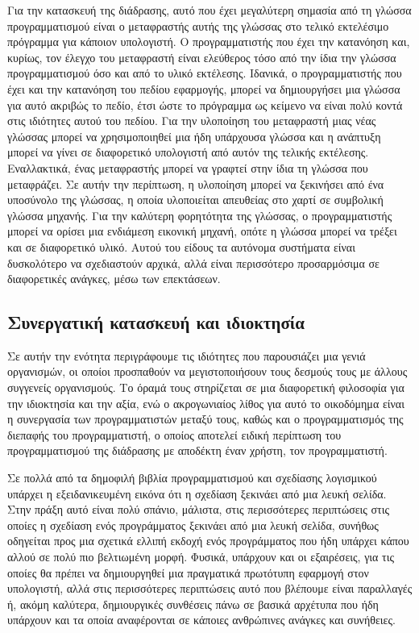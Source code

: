 \documentclass[
]{article}
\begin{document}
Για την κατασκευή της διάδρασης, αυτό που έχει μεγαλύτερη σημασία από τη
γλώσσα προγραμματισμού είναι ο μεταφραστής αυτής της γλώσσας στο τελικό
εκτελέσιμο πρόγραμμα για κάποιον υπολογιστή. Ο προγραμματιστής που έχει
την κατανόηση και, κυρίως, τον έλεγχο του μεταφραστή είναι ελεύθερος
τόσο από την ίδια την γλώσσα προγραμματισμού όσο και από το υλικό
εκτέλεσης. Ιδανικά, ο προγραμματιστής που έχει και την κατανόηση του
πεδίου εφαρμογής, μπορεί να δημιουργήσει μια γλώσσα για αυτό ακριβώς το
πεδίο, έτσι ώστε το πρόγραμμα ως κείμενο να είναι πολύ κοντά στις
ιδιότητες αυτού του πεδίου. Για την υλοποίηση του μεταφραστή μιας νέας
γλώσσας μπορεί να χρησιμοποιηθεί μια ήδη υπάρχουσα γλώσσα και η ανάπτυξη
μπορεί να γίνει σε διαφορετικό υπολογιστή από αυτόν της τελικής
εκτέλεσης. Εναλλακτικά, ένας μεταφραστής μπορεί να γραφτεί στην ίδια τη
γλώσσα που μεταφράζει. Σε αυτήν την περίπτωση, η υλοποίηση μπορεί να
ξεκινήσει από ένα υποσύνολο της γλώσσας, η οποία υλοποιείται απευθείας
στο χαρτί σε συμβολική γλώσσα μηχανής. Για την καλύτερη φορητότητα της
γλώσσας, ο προγραμματιστής μπορεί να ορίσει μια ενδιάμεση εικονική
μηχανή, οπότε η γλώσσα μπορεί να τρέξει και σε διαφορετικό υλικό. Αυτού
του είδους τα αυτόνομα συστήματα είναι δυσκολότερο να σχεδιαστούν
αρχικά, αλλά είναι περισσότερο προσαρμόσιμα σε διαφορετικές ανάγκες,
μέσω των επεκτάσεων.

\hypertarget{ux3c3ux3c5ux3bdux3b5ux3c1ux3b3ux3b1ux3c4ux3b9ux3baux3ae-ux3baux3b1ux3c4ux3b1ux3c3ux3baux3b5ux3c5ux3ae-ux3baux3b1ux3b9-ux3b9ux3b4ux3b9ux3bfux3baux3c4ux3b7ux3c3ux3afux3b1}{%
\subsection{Συνεργατική κατασκευή και
ιδιοκτησία}\label{ux3c3ux3c5ux3bdux3b5ux3c1ux3b3ux3b1ux3c4ux3b9ux3baux3ae-ux3baux3b1ux3c4ux3b1ux3c3ux3baux3b5ux3c5ux3ae-ux3baux3b1ux3b9-ux3b9ux3b4ux3b9ux3bfux3baux3c4ux3b7ux3c3ux3afux3b1}}

Σε αυτήν την ενότητα περιγράφουμε τις ιδιότητες που παρουσιάζει μια
γενιά οργανισμών, οι οποίοι προσπαθούν να μεγιστοποιήσουν τους δεσμούς
τους με άλλους συγγενείς οργανισμούς. Το όραμά τους στηρίζεται σε μια
διαφορετική φιλοσοφία για την ιδιοκτησία και την αξία, ενώ ο
ακρογωνιαίος λίθος για αυτό το οικοδόμημα είναι η συνεργασία των
προγραμματιστών μεταξύ τους, καθώς και ο προγραμματισμός της διεπαφής
του προγραμματιστή, ο οποίος αποτελεί ειδική περίπτωση του
προγραμματισμού της διάδρασης με αποδέκτη έναν χρήστη, τον
προγραμματιστή.

Σε πολλά από τα δημοφιλή βιβλία προγραμματισμού και σχεδίασης λογισμικού
υπάρχει η εξειδανικευμένη εικόνα ότι η σχεδίαση ξεκινάει από μια λευκή
σελίδα. Στην πράξη αυτό είναι πολύ σπάνιο, μάλιστα, στις περισσότερες
περιπτώσεις στις οποίες η σχεδίαση ενός προγράμματος ξεκινάει από μια
λευκή σελίδα, συνήθως οδηγείται προς μια σχετικά ελλιπή εκδοχή ενός
προγράμματος που ήδη υπάρχει κάπου αλλού σε πολύ πιο βελτιωμένη μορφή.
Φυσικά, υπάρχουν και οι εξαιρέσεις, για τις οποίες θα πρέπει να
δημιουργηθεί μια πραγματικά πρωτότυπη εφαρμογή στον υπολογιστή, αλλά
στις περισσότερες περιπτώσεις αυτό που βλέπουμε είναι παραλλαγές ή,
ακόμη καλύτερα, δημιουργικές συνθέσεις πάνω σε βασικά αρχέτυπα που ήδη
υπάρχουν και τα οποία αναφέρονται σε κάποιες ανθρώπινες ανάγκες και
συνήθειες.
\end{document}
